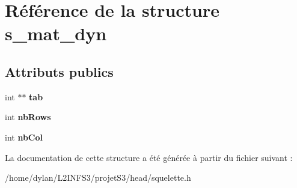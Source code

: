 \hypertarget{structs__mat__dyn}{}\section{Référence de la structure s\+\_\+mat\+\_\+dyn}
\label{structs__mat__dyn}
\subsection*{Attributs publics}
\begin{DoxyCompactItemize}
\item 
\mbox{\label{structs__mat__dyn_aab23f1bd88935bb206db29f64a1a2fbd}} 
int $\ast$$\ast$ {\bfseries tab}
\item 
\mbox{\label{structs__mat__dyn_af225cb03880f5b6d7cfe1ca1bc941988}} 
int {\bfseries nb\+Rows}
\item 
\mbox{\label{structs__mat__dyn_a5c548888f0972f9ff71d2963b3657411}} 
int {\bfseries nb\+Col}
\end{DoxyCompactItemize}


La documentation de cette structure a été générée à partir du fichier suivant \+:\begin{DoxyCompactItemize}
\item 
/home/dylan/\+L2\+I\+N\+F\+S3/projet\+S3/head/squelette.\+h\end{DoxyCompactItemize}
